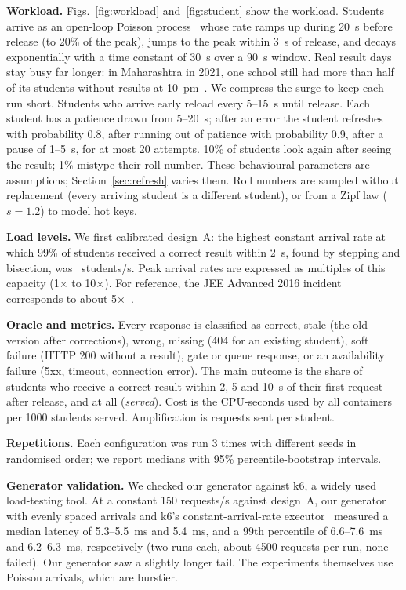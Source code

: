 \textbf{Workload.} Figs.~\ref{fig:workload} and~\ref{fig:student} show the
workload. Students arrive as an open-loop Poisson
process~\cite{schroeder2006open} whose rate ramps up during \SI{20}{s} before
release (to 20\% of the peak), jumps to the peak within \SI{3}{s} of release,
and decays exponentially with a time constant of \SI{30}{s} over a
\SI{90}{s} window. Real result days stay busy far longer: in Maharashtra in
2021, one school still had more than half of its students without results at
10~pm~\cite{ht2021ssc}. We compress the surge to keep each run short. Students
who arrive early reload every
5--\SI{15}{s} until release. Each student has a patience drawn from
5--\SI{20}{s}; after an error the student refreshes with probability 0.8, after
running out of patience with probability 0.9, after a pause of 1--\SI{5}{s},
for at most 20 attempts. 10\% of students look again after seeing the result;
1\% mistype their roll number. These behavioural parameters are assumptions;
Section~\ref{sec:refresh} varies them. Roll numbers are sampled without
replacement (every arriving student is a different student), or from a Zipf
law ($s{=}1.2$) to model hot keys.

\textbf{Load levels.} We first calibrated design~A: the highest constant
arrival rate at which 99\% of students received a correct result within
\SI{2}{s}, found by stepping and bisection, was \CapA\ students/s. Peak
arrival rates are expressed as multiples of this capacity (1$\times$ to
10$\times$). For reference, the JEE Advanced 2016 incident corresponds to
about 5$\times$~\cite{pagalguy2016jee}.

\textbf{Oracle and metrics.} Every response is classified as correct, stale
(the old version after corrections), wrong, missing (404 for an existing
student), soft failure (HTTP 200 without a result), gate or queue response, or
an availability failure (5xx, timeout, connection error). The main outcome is
the share of students who receive a correct result within 2, 5 and
\SI{10}{s} of their first request after release, and at all
(\emph{served}). Cost is the CPU-seconds used by all containers per
\num{1000} students served. Amplification is requests sent per student.

\textbf{Repetitions.} Each configuration was run 3 times with different seeds
in randomised order; we report medians with 95\% percentile-bootstrap
intervals.

\textbf{Generator validation.} We checked our generator against k6, a
widely used load-testing tool. At a constant \num{150} requests/s against
design~A, our generator with evenly spaced arrivals and k6's
constant-arrival-rate executor~\cite{k6docs} measured a median latency of
5.3--\SI{5.5}{ms} and \SI{5.4}{ms}, and a 99th percentile of
6.6--\SI{7.6}{ms} and 6.2--\SI{6.3}{ms}, respectively (two runs each, about
\num{4500} requests per run, none failed). Our generator saw a slightly longer
tail. The experiments themselves use Poisson arrivals, which are burstier.

